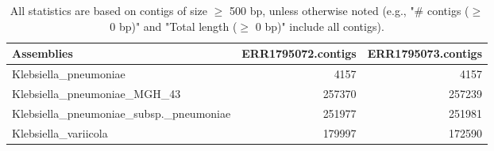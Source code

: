\documentclass[12pt,a4paper]{article}
\begin{document}
\begin{table}[ht]
\begin{center}
\caption{All statistics are based on contigs of size $\geq$ 500 bp, unless otherwise noted (e.g., "\# contigs ($\geq$ 0 bp)" and "Total length ($\geq$ 0 bp)" include all contigs).}
\begin{tabular}{|l*{2}{|r}|}
\hline
Assemblies & ERR1795072.contigs & ERR1795073.contigs \\ \hline
Klebsiella\_pneumoniae & 4157 & 4157 \\ \hline
Klebsiella\_pneumoniae\_MGH\_43 & 257370 & 257239 \\ \hline
Klebsiella\_pneumoniae\_subsp.\_pneumoniae & 251977 & 251981 \\ \hline
Klebsiella\_variicola & 179997 & 172590 \\ \hline
\end{tabular}
\end{center}
\end{table}
\end{document}
